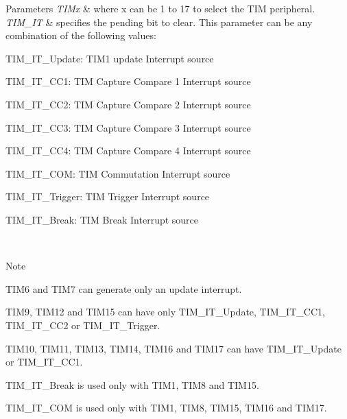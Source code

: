 \begin{DoxyParams}{Parameters}
{\em T\+I\+Mx} & where x can be 1 to 17 to select the T\+IM peripheral. \\
\hline
{\em T\+I\+M\+\_\+\+IT} & specifies the pending bit to clear. This parameter can be any combination of the following values\+: \begin{DoxyItemize}
\item T\+I\+M\+\_\+\+I\+T\+\_\+\+Update\+: T\+I\+M1 update Interrupt source \item T\+I\+M\+\_\+\+I\+T\+\_\+\+C\+C1\+: T\+IM Capture Compare 1 Interrupt source \item T\+I\+M\+\_\+\+I\+T\+\_\+\+C\+C2\+: T\+IM Capture Compare 2 Interrupt source \item T\+I\+M\+\_\+\+I\+T\+\_\+\+C\+C3\+: T\+IM Capture Compare 3 Interrupt source \item T\+I\+M\+\_\+\+I\+T\+\_\+\+C\+C4\+: T\+IM Capture Compare 4 Interrupt source \item T\+I\+M\+\_\+\+I\+T\+\_\+\+C\+OM\+: T\+IM Commutation Interrupt source \item T\+I\+M\+\_\+\+I\+T\+\_\+\+Trigger\+: T\+IM Trigger Interrupt source \item T\+I\+M\+\_\+\+I\+T\+\_\+\+Break\+: T\+IM Break Interrupt source \end{DoxyItemize}
\\
\hline
\end{DoxyParams}
\begin{DoxyNote}{Note}

\begin{DoxyItemize}
\item T\+I\+M6 and T\+I\+M7 can generate only an update interrupt.
\item T\+I\+M9, T\+I\+M12 and T\+I\+M15 can have only T\+I\+M\+\_\+\+I\+T\+\_\+\+Update, T\+I\+M\+\_\+\+I\+T\+\_\+\+C\+C1, T\+I\+M\+\_\+\+I\+T\+\_\+\+C\+C2 or T\+I\+M\+\_\+\+I\+T\+\_\+\+Trigger.
\item T\+I\+M10, T\+I\+M11, T\+I\+M13, T\+I\+M14, T\+I\+M16 and T\+I\+M17 can have T\+I\+M\+\_\+\+I\+T\+\_\+\+Update or T\+I\+M\+\_\+\+I\+T\+\_\+\+C\+C1.
\item T\+I\+M\+\_\+\+I\+T\+\_\+\+Break is used only with T\+I\+M1, T\+I\+M8 and T\+I\+M15.
\item T\+I\+M\+\_\+\+I\+T\+\_\+\+C\+OM is used only with T\+I\+M1, T\+I\+M8, T\+I\+M15, T\+I\+M16 and T\+I\+M17. 
\end{DoxyItemize}
\end{DoxyNote}

